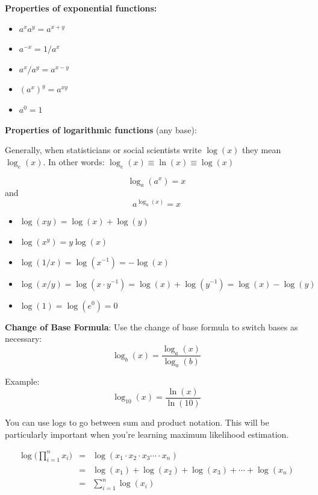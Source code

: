 \documentclass[
]{book}
\providecommand{\tightlist}{%
  \setlength{\itemsep}{0pt}\setlength{\parskip}{0pt}}
\theoremstyle{definition}
\theoremstyle{definition}
\theoremstyle{definition}
\theoremstyle{definition}
\theoremstyle{remark}
\begin{document}

\textbf{Properties of exponential functions:}

\begin{itemize}
\tightlist
\item
  \(a^x a^y = a^{x+y}\)
\item
  \(a^{-x} = 1/a^x\)
\item
  \(a^x/a^y = a^{x-y}\)
\item
  \((a^x)^y = a^{x y}\)
\item
  \(a^0 = 1\)
\end{itemize}

\textbf{Properties of logarithmic functions} (any base):

Generally, when statisticians or social scientists write \(\log(x)\) they mean \(\log_e(x)\). In other words: \(\log_e(x) \equiv \ln(x) \equiv \log(x)\)

\[\log_a(a^x)=x\] and
\[a^{\log_a(x)}=x\]

\begin{itemize}
\tightlist
\item
  \(\log(x y)=\log(x)+\log(y)\)
\item
  \(\log(x^y)=y\log(x)\)
\item
  \(\log(1/x)=\log(x^{-1})=-\log(x)\)
\item
  \(\log(x/y)=\log(x\cdot y^{-1})=\log(x)+\log(y^{-1})=\log(x)-\log(y)\)
\item
  \(\log(1)=\log(e^0)=0\)
\end{itemize}

\textbf{Change of Base Formula}: Use the change of base formula to switch bases as necessary:
\[\log_b(x) = \frac{\log_a(x)}{\log_a(b)}\]

Example: \[\log_{10}(x) = \frac{\ln(x)}{\ln(10)}\]

You can use logs to go between sum and product notation. This will be particularly important when you're learning maximum likelihood estimation.

\begin{eqnarray*}
            \log \bigg(\prod\limits_{i=1}^n x_i \bigg) &=& \log(x_1 \cdot x_2 \cdot x_3 \cdots \cdot x_n)\\
            &=& \log(x_1) + \log(x_2) + \log(x_3) + \cdots + \log(x_n)\\
            &=& \sum\limits_{i=1}^n \log (x_i)
\end{eqnarray*}
\end{document}
